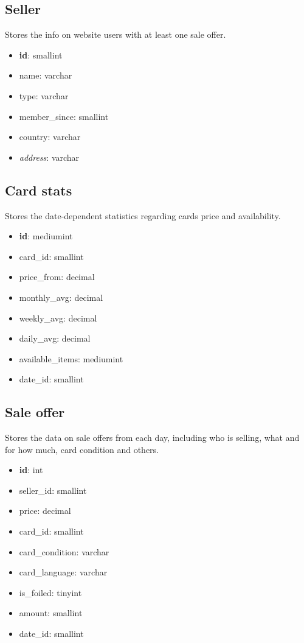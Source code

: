 \subsection*{Seller}
Stores the info on website users with at least one sale offer.
\begin{itemize}
\setlength\itemsep{0.2em}
\item \textbf{id}: smallint
\item name: varchar
\item type: varchar
\item member\_since: smallint
\item country: varchar
\item \textit{address}: varchar
\end{itemize}

\subsection*{Card stats}
Stores the date-dependent statistics regarding cards price and availability.
\begin{itemize}
\setlength\itemsep{0.2em}
\item \textbf{id}: mediumint
\item card\_id: smallint
\item price\_from: decimal
\item monthly\_avg: decimal
\item weekly\_avg: decimal
\item daily\_avg: decimal
\item available\_items: mediumint
\item date\_id: smallint
\end{itemize}

\subsection*{Sale offer}
Stores the data on sale offers from each day, including who is selling, what and for how much, card condition and others.
\begin{itemize}
\setlength\itemsep{0.2em}
\item \textbf{id}: int
\item seller\_id: smallint
\item price: decimal
\item card\_id: smallint
\item card\_condition: varchar
\item card\_language: varchar
\item is\_foiled: tinyint
\item amount: smallint
\item date\_id: smallint
\end{itemize}

